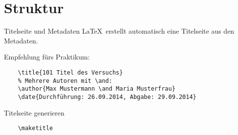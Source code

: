 \section{Struktur}

\begin{frame}[fragile]{Titelseite und Metadaten}
  \LaTeX\ erstellt automatisch eine Titelseite aus den Metadaten.

  \begin{block}{Empfehlung fürs Praktikum:}
    \begin{lstlisting}
    \title{101 Titel des Versuchs}
    % Mehrere Autoren mit \and:
    \author{Max Mustermann \and Maria Musterfrau}
    \date{Durchführung: 26.09.2014, Abgabe: 29.09.2014}
    \end{lstlisting}
  \end{block}

  \begin{block}{Titelseite generieren}
    \begin{lstlisting}
    \maketitle
    \end{lstlisting}
  \end{block}
\end{frame}

